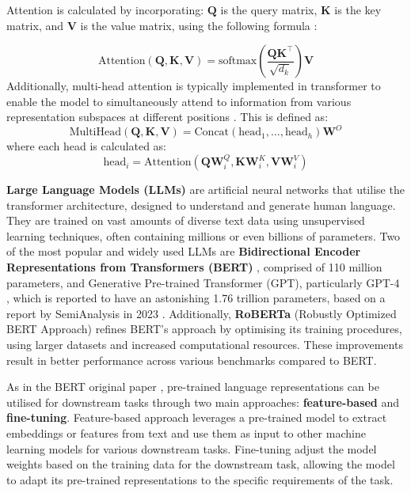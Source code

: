 Attention is calculated by incorporating: \(\mathbf{Q}\) is the query matrix, \(\mathbf{K}\) is the key matrix, and \(\mathbf{V}\) is the value matrix, using the following formula \cite{vaswani-2023-attention}:

\begin{equation}
    \label{eq:attention}
    \text{Attention}(\mathbf{Q}, \mathbf{K}, \mathbf{V}) = \text{softmax}\left( \frac{\mathbf{Q}\mathbf{K}^\top}{\sqrt{d_k}} \right) \mathbf{V}
\end{equation}
Additionally, multi-head attention is typically implemented in transformer to enable the model to simultaneously attend to information from various representation subspaces at different positions \cite{vaswani-2023-attention}. This is defined as:
\begin{equation}
    \label{eq:multihead}
    \text{MultiHead}(\mathbf{Q}, \mathbf{K}, \mathbf{V}) = \text{Concat}(\text{head}_1, \ldots, \text{head}_h) \mathbf{W}^O
\end{equation}
where each head is calculated as:
\begin{equation}
    \label{eq:head}
    \text{head}_i = \text{Attention}(\mathbf{Q} \mathbf{W}^Q_i, \mathbf{K} \mathbf{W}^K_i, \mathbf{V} \mathbf{W}^V_i)
\end{equation}


\textbf{Large Language Models (LLMs)} are artificial neural networks that utilise the transformer architecture, designed to understand and generate human language. They are trained on vast amounts of diverse text data using unsupervised learning techniques, often containing millions or even billions of parameters. Two of the most popular and widely used LLMs are \textbf{Bidirectional Encoder Representations from Transformers (BERT)} \cite{devlin-2019-bert}, comprised of 110 million parameters, and Generative Pre-trained Transformer (GPT), particularly GPT-4 \cite{openai-2024-gpt4}, which is reported to have an astonishing 1.76 trillion parameters, based on a report by SemiAnalysis in 2023 \cite{semianalysis-gpt4}. Additionally, \textbf{RoBERTa} \cite{liu-2019-roberta} (Robustly Optimized BERT Approach) refines BERT's approach by optimising its training procedures, using larger datasets and increased computational resources. These improvements result in better performance across various benchmarks compared to BERT.

As in the BERT original paper \cite{devlin-2019-bert}, pre-trained language representations can be utilised for downstream tasks through two main approaches: \textbf{feature-based} and \textbf{fine-tuning}. Feature-based approach \cite{devlin-2019-bert} leverages a pre-trained model to extract embeddings or features from text and use them as input to other machine learning models for various downstream tasks. Fine-tuning \cite{devlin-2019-bert} adjust the model weights based on the training data for the downstream task, allowing the model to adapt its pre-trained representations to the specific requirements of the task.

